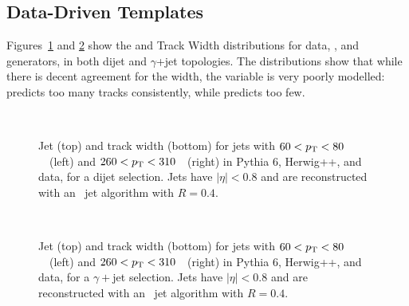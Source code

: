 
\subsection{Data-Driven Templates}

Figures~\ref{fig:jet-reconstruction:qg:dijetProperties} and \ref{fig:jet-reconstruction:qg:gammajetProperties} show the \ntrk and Track Width distributions for data, \Pythia, and \Herwigpp generators, in both dijet and $\gamma$+jet topologies. The distributions show that while there is decent agreement for the width, the \ntrk variable is very poorly modelled: \Pythia predicts too many tracks consistently, while \Herwigpp predicts too few. 

\begin{figure}[tbp]
\begin{center}
 \\
\caption{
Jet \ntrk (top) and track width (bottom) for jets with $60<p_{\text{T}}<80$~\GeV\ (left) and
$260<p_{\text{T}}<310$~\GeV\ (right) in {\sc Pythia} 6, {\sc Herwig++}, and data, for a dijet selection.
Jets have $|\eta|<0.8$ and are reconstructed with an \AKT\ jet algorithm with $R=0.4$.
 }
\label{fig:jet-reconstruction:qg:dijetProperties}
\end{center}
\end{figure}

\begin{figure}[tbp]
\begin{center}
 \\
\caption{
Jet \ntrk (top) and track width (bottom) for jets with $60<p_{\text{T}}<80$~\GeV\ (left) and
$260<p_{\text{T}}<310$~\GeV\ (right) in {\sc Pythia} 6, {\sc Herwig++}, and data, for a $\gamma+$jet selection.
Jets have $|\eta|<0.8$ and are reconstructed with an \AKT\ jet algorithm with $R=0.4$.
 }
\label{fig:jet-reconstruction:qg:gammajetProperties}
\end{center}
\end{figure}

